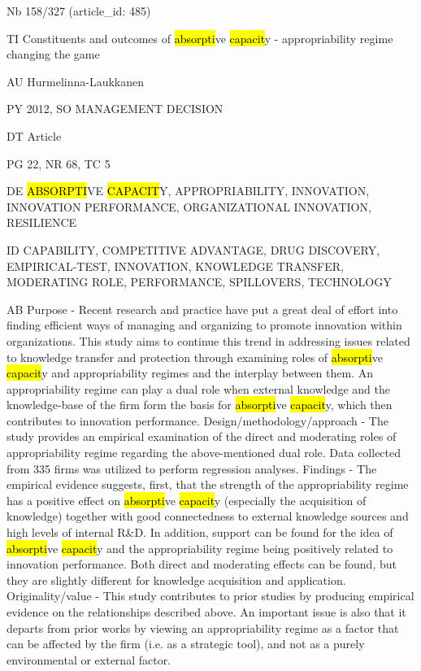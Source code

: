 \documentclass[a4paper]{article}
\begin{document}
\vspace*{-2cm}
Nb \tabto{0cm}158/327 (article\_id: 485)\par
TI \tabto{0cm}Constituents and outcomes of \hl{absorpti}ve \hl{capacit}y - appropriability regime changing the game\par
AU \tabto{0cm}Hurmelinna-Laukkanen\par
PY \tabto{0cm}2012, SO MANAGEMENT DECISION\par
DT \tabto{0cm}Article\par
PG \tabto{0cm}22, NR 68, TC 5\par
DE \tabto{0cm}\hl{ABSORPTI}VE \hl{CAPACIT}Y, APPROPRIABILITY, INNOVATION, INNOVATION PERFORMANCE, ORGANIZATIONAL INNOVATION, RESILIENCE\par
ID \tabto{0cm}CAPABILITY, COMPETITIVE ADVANTAGE, DRUG DISCOVERY, EMPIRICAL-TEST, INNOVATION, KNOWLEDGE TRANSFER, MODERATING ROLE, PERFORMANCE, SPILLOVERS, TECHNOLOGY\par
AB \tabto{0cm}Purpose - Recent research and practice have put a great deal of effort into finding efficient ways of managing and organizing to promote innovation within organizations. This study aims to continue this trend in addressing issues related to knowledge transfer and protection through examining roles of \hl{absorpti}ve \hl{capacit}y and appropriability regimes and the interplay between them. An appropriability regime can play a dual role when external knowledge and the knowledge-base of the firm form the basis for \hl{absorpti}ve \hl{capacit}y, which then contributes to innovation performance.
Design/methodology/approach - The study provides an empirical examination of the direct and moderating roles of appropriability regime regarding the above-mentioned dual role. Data collected from 335 firms was utilized to perform regression analyses.
Findings - The empirical evidence suggests, first, that the strength of the appropriability regime has a positive effect on \hl{absorpti}ve \hl{capacit}y (especially the acquisition of knowledge) together with good connectedness to external knowledge sources and high levels of internal R\&D. In addition, support can be found for the idea of \hl{absorpti}ve \hl{capacit}y and the appropriability regime being positively related to innovation performance. Both direct and moderating effects can be found, but they are slightly different for knowledge acquisition and application.
Originality/value - This study contributes to prior studies by producing empirical evidence on the relationships described above. An important issue is also that it departs from prior works by viewing an appropriability regime as a factor that can be affected by the firm (i.e. as a strategic tool), and not as a purely environmental or external factor.\par
\clearpage
\end{document}
